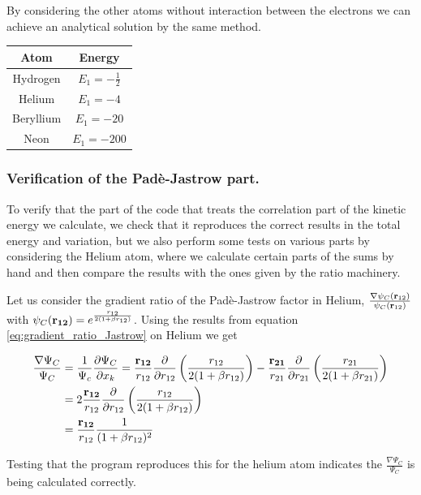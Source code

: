 \documentclass[11pt]{article}
\begin{document}
			By considering the other atoms without interaction between the electrons we can achieve an analytical solution by the same method.
			\begin{center}
				\begin{tabular}{| c | c |}
				\bottomrule
				Atom & Energy
				\\ \hline
				Hydrogen 	& \( E_1 = -\frac{1}{2} \)
				\\ \hline
				Helium 		& \( E_1 = -4\)
				\\ \hline Beryllium		& \( E_1 = -20 \)
				\\ \hline Neon		& \( E_1 = -200 \)
				\\ \toprule
				\end{tabular}
			\end{center}

		\subsubsection{Verification of the Padè-Jastrow part.}
			To verify that the part of the code that treats the correlation part of the kinetic energy we calculate, we check that it reproduces the correct results in the total energy and variation, but we also perform some tests on various parts by considering the Helium atom, where we calculate certain parts of the sums by hand and then compare the results with the ones given by the ratio machinery.

			Let us consider the gradient ratio of the Padè-Jastrow factor in Helium, \(\frac{\nabla\psi_C(\vb{r}_{12})}{\psi_C(\vb{r}_{12})}\) with \(\psi_C(\vb{r_{12}}) = e^{\frac{r_{12}}{2(1+\beta r_{12})}}\). Using the results from equation \eqref{eq:gradient_ratio_Jastrow} on Helium we get

			\begin{align}
				\frac{\nabla\Psi_C}{\Psi_C} &= \frac{1}{\Psi_c} \pdv{\Psi_C}{x_k} = \frac{\vb{r_{12}}}{r_{12}}\pdv{}{r_{12}}\left( \frac{r_{12}}{2(1+\beta r_{12})} \right) - \frac{\vb{r_{21}}}{r_{21}}\pdv{}{r_{21}}\left( \frac{r_{21}}{2(1+\beta r_{21})} \right)
				\\
				&= 2\frac{\vb{r_{12}}}{r_{12}}\pdv{}{r_{12}}\left( \frac{r_{12}}{2(1+\beta r_{12})} \right)
				\\
				&= \frac{\vb{r_{12}}}{r_{12}} \frac{1}{(1+\beta r_{12})^2}
			\end{align}

			Testing that the program reproduces this for the helium atom indicates the \(\frac{\nabla \Psi_C}{\Psi_C}\) is being calculated correctly.
\end{document}
